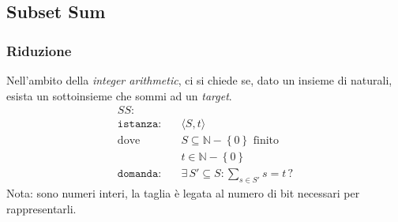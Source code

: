 \subsection{Subset Sum}
\label{sss:subsetsum}
\subsubsection{Riduzione}

Nell'ambito della \emph{integer arithmetic}, ci si chiede se, dato un insieme di naturali, esista un sottoinsieme che sommi ad un \emph{target}.
\begin{align*}
    SS: & \\
    \texttt{istanza:} \quad & \langle S,t \rangle \\
    \text{dove} \quad & S \subseteq \mathbb{N} - \left\{ 0 \right\} \text{ finito} \\
    & t \in \mathbb{N} - \left\{ 0 \right\} \\
    \texttt{domanda:} \quad & \exists \, S' \subseteq S : \sum_{s \in S'}^{} s = t \, ?
\end{align*}
Nota: sono numeri interi, la taglia è legata al numero di bit necessari per rappresentarli.

